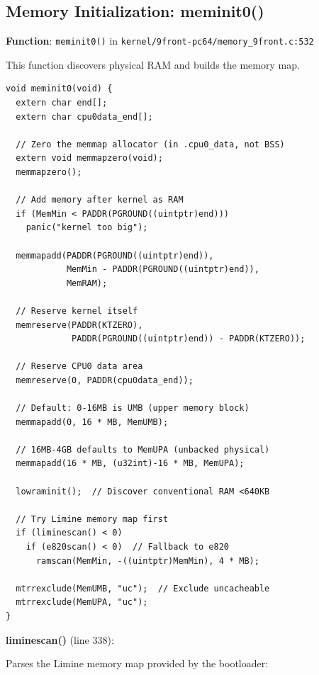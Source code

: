 \documentclass[11pt,letterpaper]{article}
\begin{document}
\subsection{Memory Initialization: meminit0()}

\textbf{Function}: \texttt{meminit0()} in \texttt{kernel/9front-pc64/memory\_9front.c:532}

This function discovers physical RAM and builds the memory map.

\begin{lstlisting}[caption=meminit0() entry]
void meminit0(void) {
  extern char end[];
  extern char cpu0data_end[];

  // Zero the memmap allocator (in .cpu0_data, not BSS)
  extern void memmapzero(void);
  memmapzero();

  // Add memory after kernel as RAM
  if (MemMin < PADDR(PGROUND((uintptr)end)))
    panic("kernel too big");

  memmapadd(PADDR(PGROUND((uintptr)end)),
            MemMin - PADDR(PGROUND((uintptr)end)),
            MemRAM);

  // Reserve kernel itself
  memreserve(PADDR(KTZERO),
             PADDR(PGROUND((uintptr)end)) - PADDR(KTZERO));

  // Reserve CPU0 data area
  memreserve(0, PADDR(cpu0data_end));

  // Default: 0-16MB is UMB (upper memory block)
  memmapadd(0, 16 * MB, MemUMB);

  // 16MB-4GB defaults to MemUPA (unbacked physical)
  memmapadd(16 * MB, (u32int)-16 * MB, MemUPA);

  lowraminit();  // Discover conventional RAM <640KB

  // Try Limine memory map first
  if (liminescan() < 0)
    if (e820scan() < 0)  // Fallback to e820
      ramscan(MemMin, -((uintptr)MemMin), 4 * MB);

  mtrrexclude(MemUMB, "uc");  // Exclude uncacheable
  mtrrexclude(MemUPA, "uc");
}
\end{lstlisting}

\textbf{liminescan()} (line 338):

Parses the Limine memory map provided by the bootloader:
\end{document}
